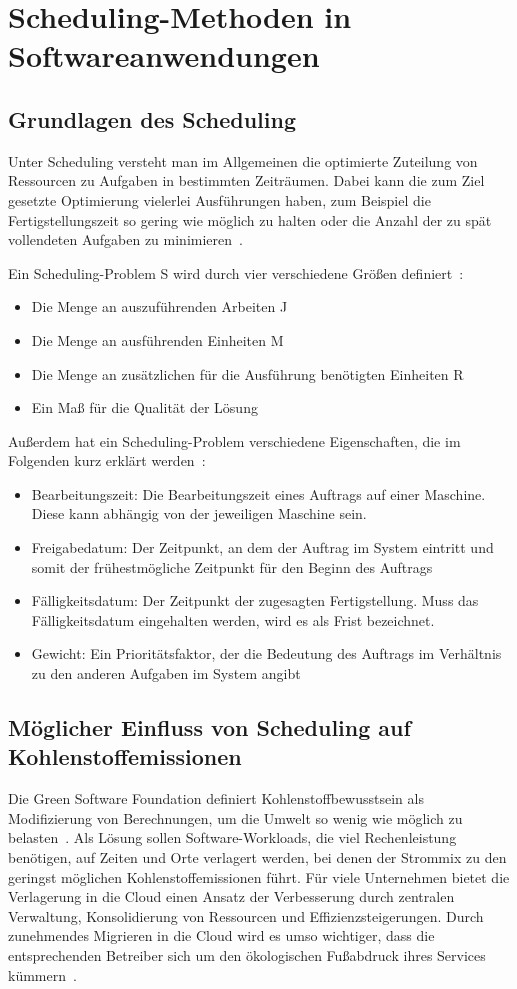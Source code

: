 \section{Scheduling-Methoden in Softwareanwendungen}
\subsection{Grundlagen des Scheduling}
Unter Scheduling versteht man im Allgemeinen die optimierte Zuteilung von Ressourcen zu Aufgaben in bestimmten Zeiträumen.
Dabei kann die zum Ziel gesetzte Optimierung vielerlei Ausführungen haben, zum Beispiel die Fertigstellungszeit so gering wie möglich zu halten oder die Anzahl der zu spät vollendeten Aufgaben zu minimieren~\cite{Gawiejnowicz.2020}.

Ein Scheduling-Problem S wird durch vier verschiedene Größen definiert~\cite{Gawiejnowicz.2020}:
\begin{itemize}
 \item Die Menge an auszuführenden Arbeiten J
 \item Die Menge an ausführenden Einheiten M
 \item Die Menge an zusätzlichen für die Ausführung benötigten Einheiten R
 \item Ein Maß für die Qualität der Lösung %
\end {itemize}
Außerdem hat ein Scheduling-Problem verschiedene Eigenschaften, die im Folgenden kurz erklärt werden~\cite{Pinedo.2022}:
\begin{itemize}
 \item Bearbeitungszeit: Die Bearbeitungszeit eines Auftrags auf einer Maschine. Diese kann abhängig von der jeweiligen Maschine sein.
 \item Freigabedatum: Der Zeitpunkt, an dem der Auftrag im System eintritt und somit der frühestmögliche Zeitpunkt für den Beginn des Auftrags
 \item Fälligkeitsdatum: Der Zeitpunkt der zugesagten Fertigstellung. Muss das Fälligkeitsdatum eingehalten werden, wird es als Frist bezeichnet.
 \item Gewicht: Ein Prioritätsfaktor, der die Bedeutung des Auftrags im Verhältnis zu den anderen Aufgaben im System angibt
\end{itemize}

\subsection{Möglicher Einfluss von Scheduling auf Kohlenstoffemissionen}
Die Green Software Foundation definiert Kohlenstoffbewusstsein als Modifizierung von Berechnungen, um die Umwelt so wenig wie möglich zu belasten~\cite{GreenSoftwareFoundation.2022}.
Als Lösung sollen Software-Workloads, die viel Rechenleistung benötigen, auf Zeiten und Orte verlagert werden, bei denen der Strommix zu den geringst möglichen Kohlenstoffemissionen führt.
Für viele Unternehmen bietet die Verlagerung in die Cloud einen Ansatz der Verbesserung durch zentralen Verwaltung, Konsolidierung von Ressourcen und Effizienzsteigerungen.
Durch zunehmendes Migrieren in die Cloud wird es umso wichtiger, dass die entsprechenden Betreiber sich um den ökologischen Fußabdruck ihres Services kümmern~\cite{Buchanan.2023}.


